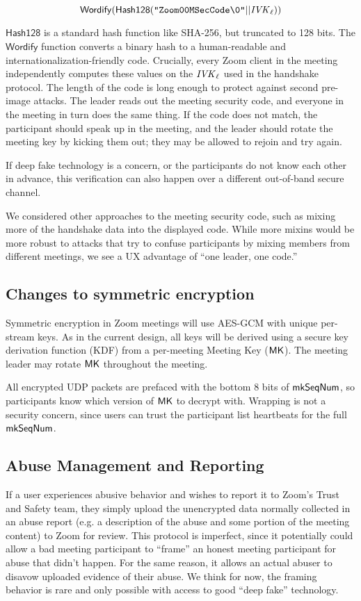 $$\mathsf{Wordify}(\mathsf{Hash128}(\texttt{"Zoom00MSecCode\textbackslash0"} || \mathit{IVK}_{\ell}))$$

$\mathsf{Hash128}$ is a standard hash function like SHA-256, but truncated to 128 bits. The $\mathsf{Wordify}$ function converts a binary hash to a human-readable and internationalization-friendly code. Crucially, every Zoom client in the meeting independently computes these values on the $\mathit{IVK}_{\ell}$ used in the handshake protocol. The length of the code is long enough to protect against second pre-image attacks. The leader reads out the meeting security code, and everyone in the meeting in turn does the same thing. If the code does not match, the participant should speak up in the meeting, and the leader should rotate the meeting key by kicking them out; they may be allowed to rejoin and try again.

If deep fake technology is a concern, or the participants do not know each other in advance, this verification can also happen over a different out-of-band secure channel.

We considered other approaches to the meeting security code, such as mixing more of the handshake data into the displayed code. While more mixins would be more robust to attacks that try to confuse participants by mixing members from different meetings, we see a UX advantage of ``one leader, one code.''

\subsection{Changes to symmetric encryption}
Symmetric encryption in Zoom meetings will use AES-GCM with unique per-stream keys. As in the current design, all keys will be derived using a secure key derivation function (KDF) from a per-meeting Meeting Key (${\sf MK}$). The meeting leader may rotate ${\sf MK}$ throughout the meeting.

All encrypted UDP packets are prefaced with the bottom 8 bits of $\mathsf{mkSeqNum}$, so participants know which version of ${\sf MK}$ to decrypt with. Wrapping is not a security concern, since users can trust the participant list heartbeats for the full $\mathsf{mkSeqNum}$.

\subsection{Abuse Management and Reporting}
If a user experiences abusive behavior and wishes to report it to Zoom's Trust and Safety team, they simply upload the unencrypted data normally collected in an abuse report (e.g. a description of the abuse and some portion of the meeting content) to Zoom for review. This protocol is imperfect, since it potentially could allow a bad meeting participant to ``frame'' an honest meeting participant for abuse that didn't happen. For the same reason, it allows an actual abuser to disavow uploaded evidence of their abuse. We think for now, the framing behavior is rare and only possible with access to good ``deep fake'' technology.

